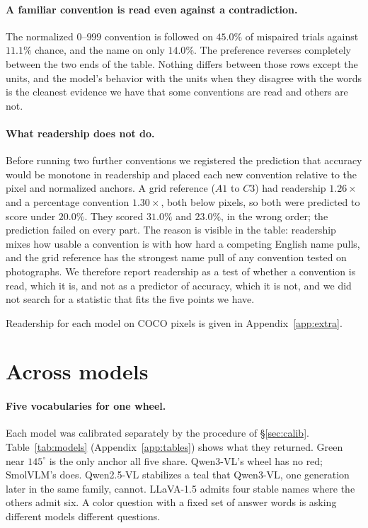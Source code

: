 \documentclass{article}
\begin{document}
\paragraph{A familiar convention is read even against a contradiction.} The
normalized $0$--$999$ convention is followed on $45.0\%$ of mispaired trials
against $11.1\%$ chance, and the name on only $14.0\%$. The preference reverses
completely between the two ends of the table. Nothing differs between those rows
except the units, and the model's behavior with the units when they disagree with
the words is the cleanest evidence we have that some conventions are read and
others are not.

\paragraph{What readership does not do.} Before running two further conventions
we registered the prediction that accuracy would be monotone in readership and
placed each new convention relative to the pixel and normalized anchors. A grid
reference ($A1$ to $C3$) had readership $1.26\times$ and a percentage convention
$1.30\times$, both below pixels, so both were predicted to score under $20.0\%$.
They scored $31.0\%$ and $23.0\%$, in the wrong order; the prediction failed on
every part. The reason is visible in the table: readership mixes how usable a
convention is with how hard a competing English name pulls, and the grid reference has the strongest name pull of any convention tested on photographs. We therefore report readership as
a test of whether a convention is read, which it is, and not as a predictor of
accuracy, which it is not, and we did not search for a statistic that fits the
five points we have.

Readership for each model on COCO pixels is given in
Appendix~\ref{app:extra}.

\section{Across models}
\label{sec:models}

\paragraph{Five vocabularies for one wheel.} Each model was calibrated separately
by the procedure of \S\ref{sec:calib}. Table~\ref{tab:models}
(Appendix~\ref{app:tables}) shows what they returned. Green near $145^\circ$ is the only anchor all five share. Qwen3-VL's
wheel has no red; SmolVLM's does. Qwen2.5-VL stabilizes a teal that Qwen3-VL,
one generation later in the same family, cannot. LLaVA-1.5 admits four stable
names where the others admit six. A color question with a fixed set of answer
words is asking different models different questions.
\end{document}
